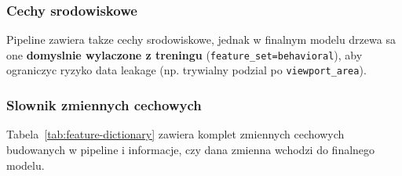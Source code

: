 \subsubsection{Cechy srodowiskowe}
Pipeline zawiera takze cechy srodowiskowe, jednak w finalnym modelu drzewa
sa one \textbf{domyslnie wylaczone z treningu} (\texttt{feature\_set=behavioral}),
aby ograniczyc ryzyko data leakage (np. trywialny podzial po \texttt{viewport\_area}).

\subsubsection{Slownik zmiennych cechowych}
Tabela~\ref{tab:feature-dictionary} zawiera komplet zmiennych cechowych budowanych
w pipeline i informacje, czy dana zmienna wchodzi do finalnego modelu.


